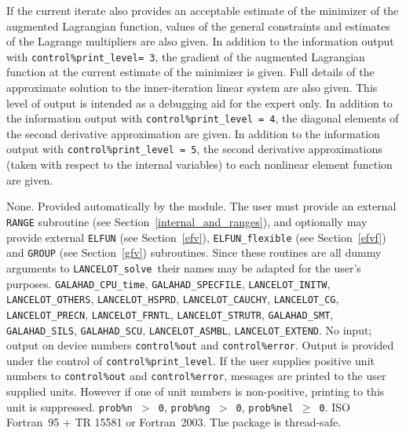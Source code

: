\documentclass{galahad}
\newcommand{\fullpackagename}{LANC\-E\-LOT}
\newcommand{\solver}{{\tt \fullpackagename\_solve}}
\begin{document}
\begin{description}
                 If the current iterate also provides an acceptable
                 estimate of the minimizer of the augmented Lagrangian
                 function, values of the general constraints and
                 estimates of the Lagrange multipliers are also given.
 In addition to the information output with
                 {\tt control\%print\_level= 3},
                 the gradient of the augmented Lagrangian function at
                 the current estimate of the minimizer is given.
                 Full details of the approximate solution
                 to the inner-iteration linear system are also given.
                 This level of output is intended as a debugging aid
                 for the expert only.
 In addition to the information output with
                 {\tt control\%print\_level = 4},
                 the diagonal elements of the second derivative
                 approximation are given.
 In addition to the information output with
                  {\tt control\%print\_level = 5},
                  the second derivative approximations
                  (taken with respect to the internal variables)
                  to each nonlinear element function are given.
\end{description}


\galgeneral

\galcommon None.
\galworkspace Provided automatically by the module.
\galroutines The user must provide an external {\tt RANGE} subroutine
(see Section~\ref{internal_and_ranges}), and optionally may provide
external {\tt ELFUN} (see Section~\ref{efv}),
{\tt ELFUN\_flexible} (see Section~\ref{efvf}) and
{\tt GROUP} (see Section~\ref{gfv}) subroutines. Since these
routines are all dummy arguments to \solver\, their names may be
adapted for the user's purposes.
\galmodules
{\tt GALAHAD\_CPU\_time},
{\tt GALAHAD\_SPECFILE},
{\tt LANCELOT\_INITW},
{\tt LANCELOT\_OTHERS},
{\tt LAN\-CELOT\_HSPRD},
{\tt LANCELOT\_CAUCHY},
{\tt LANCELOT\_CG},
{\tt LANCELOT\_PRECN},
{\tt LANCELOT\_FRNTL},
{\tt LANCELOT\_STRUTR},
{\tt GAL\-AHAD\_SMT},
{\tt GAL\-AHAD\_SILS},
{\tt GALAHAD\_SCU},
{\tt LANCELOT\_ASMBL},
{\tt LANCELOT\_EXTEND}.
\galio No input; output on device numbers {\tt control\%out} and
{\tt control\%error}.
    Output is provided under the control of {\tt control\%print\_level}.
     If the user supplies positive unit numbers to {\tt control\%out} and
{\tt control\%error}, messages
     are printed to the user supplied units. However if one of unit
     numbers is non-positive, printing to this unit is suppressed.
\galrestrictions
     {\tt prob\%n $>$ 0},
     {\tt prob\%ng $>$ 0},
     {\tt prob\%nel $\geq$ 0}.
\galportability ISO Fortran~95 + TR 15581 or Fortran~2003. The package is thread-safe.
\end{document}
